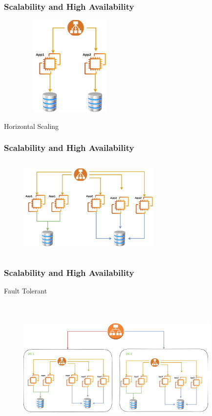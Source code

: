 \documentclass{beamer}
\begin{document}
	\begin{frame}
		\frametitle{Scalability and High Availability}
		\begin{figure}[h]
			\includegraphics[width=50mm, height=50mm, scale=1]{img/Scalability-1.jpg}
		\end{figure}	
	\end{frame}

	\begin{frame}
		Horizontal Scaling
		\frametitle{Scalability and High Availability}
		\begin{figure}[h]
			\includegraphics[width=70mm, height=50mm, scale=1]{img/horizontal-scaling.jpg}
		\end{figure}	
	\end{frame}

	\begin{frame}
		\frametitle{Scalability and High Availability}
		Fault Tolerant
		\begin{figure}[h]
			\includegraphics[width=100mm, height=70mm, scale=1]{img/High-Availability.jpg}
		\end{figure}	
	\end{frame}	
\end{document}
